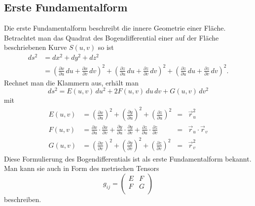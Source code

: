 \subsection{Erste Fundamentalform
\label{mongeampere:subsection:finibus}}
Die erste Fundamentalform beschreibt die innere Geometrie einer Fläche.
Betrachtet man das Quadrat des Bogendifferential einer auf der Fläche 
beschriebenen Kurve $S(u,v)$ so ist 
\begin{equation}
  \begin{split}
    d s^2 &= d x^2 + d y^2 + d z^2 \\
          &= \left(\frac{\partial x}{\partial u}\,d u + \frac{\partial x}{\partial v}\,d v  \right)^2
          + \left(\frac{\partial z}{\partial u}\,d u + \frac{\partial z}{\partial v}\,d v  \right)^2
          + \left(\frac{\partial z}{\partial u}\,d u + \frac{\partial z}{\partial v}\,d v  \right)^2.
  \end{split}
  \label{mongeampere:bogdiff}
\end{equation}
Rechnet man die Klammern aus, erhält man 
\begin{equation}
    d s^2 = E(u,v) \,d u^2 + 2F(u,v) \,d u \,d v + G(u,v)\,d v^2
    \label{mongeampere:1fundform}
\end{equation}
mit
\begin{equation*}
\begin{aligned}
     E(u,v) &= \left(\frac{\partial x}{\partial u} \right)^2 +
     \left(\frac{\partial y}{\partial u} \right)^2 +
     \left(\frac{\partial z}{\partial u} \right)^2 
            &=& \vec r_u^2\\
     F(u,v) &= 
     \frac{\partial x}{\partial u} \cdot \frac{\partial x}{\partial v} +
     \frac{\partial y}{\partial u} \cdot \frac{\partial y}{\partial v} +
     \frac{\partial z}{\partial u} \cdot \frac{\partial z}{\partial v}
            &=& \vec r_u \cdot \vec r_v \\
      G(u,v) &= \left(\frac{\partial x}{\partial v} \right)^2 +
     \left(\frac{\partial y}{\partial v} \right)^2 +
     \left(\frac{\partial z}{\partial v} \right)^2 
             &=& \vec r_v ^2
  \label{mongeampere:1fundbed}
\end{aligned}
\end{equation*}
Diese Formulierung des Bogendifferentials ist als erste Fundamentalform bekannt.
Man kann sie auch in Form des metrischen Tensors 
\begin{equation}
  g_{ij} = \begin{pmatrix}
    E & F \\
    F & G \\
  \end{pmatrix}
  \label{mongeampere:erstmettens}
\end{equation}
beschreiben.

